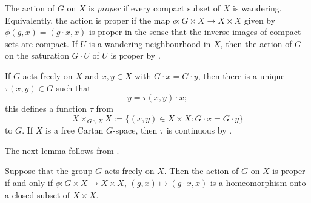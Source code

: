 \documentclass[12pt,a4paper]{amsart}
\begin{document}
The action of $G$ on $X$ is \emph{proper} if every compact
subset of $X$ is wandering.
Equivalently, the action is proper
if the map $\phi : G \times X \to X \times X$ given by
$\phi(g,x) = (g\cdot x, x)$ is proper in the sense that the
inverse images of compact sets are compact.
If $U$ is a
wandering neighbourhood in $X$, then the action of $G$ on the
saturation $G\cdot U$ of $U$ is proper by
\cite[Proposition~1.2.4]{P}.

If $G$ acts freely on $X$ and $x,y\in X$ with $G\cdot x=G\cdot
y$, then there is a unique $\tau(x,y)\in G$ such that
\begin{equation}\label{eq:tau def}
y=\tau(x,y)\cdot x;
\end{equation}
this defines a function $\tau$ from
\[
X\times_{G\backslash X} X:=\{(x,y)\in X\times X:G\cdot x=G\cdot y\}
\]
to $G$.  If $X$ is a free Cartan $G$-space, then $\tau$ is
continuous by \cite[Theorem~1.1.3]{P}.

The next lemma follows from \cite[I.10.1
Proposition~2]{Bourbaki}.

\begin{lemma}\label{lem-proper}
Suppose that the group $G$ acts freely on $X$. Then the action
of $G$ on $X$ is proper if and only if $\phi:G\times X\to
X\times X$, $(g,x)\mapsto (g\cdot x, x)$ is a homeomorphism
onto a closed subset of $X\times X$.
\end{lemma}
%
%
\end{document}
